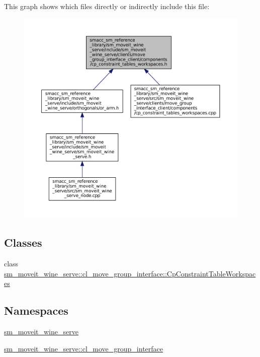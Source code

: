 This graph shows which files directly or indirectly include this file\+:
\nopagebreak
\begin{figure}[H]
\begin{center}
\leavevmode
\includegraphics[width=350pt]{sm__moveit__wine__serve_2include_2sm__moveit__wine__serve_2clients_2move__group__interface__clie8a6212d3ea5fcfefa4f3225b39b4159d}
\end{center}
\end{figure}
\subsection*{Classes}
\begin{DoxyCompactItemize}
\item 
class \hyperlink{classsm__moveit__wine__serve_1_1cl__move__group__interface_1_1CpConstraintTableWorkspaces}{sm\+\_\+moveit\+\_\+wine\+\_\+serve\+::cl\+\_\+move\+\_\+group\+\_\+interface\+::\+Cp\+Constraint\+Table\+Workspaces}
\end{DoxyCompactItemize}
\subsection*{Namespaces}
\begin{DoxyCompactItemize}
\item 
 \hyperlink{namespacesm__moveit__wine__serve}{sm\+\_\+moveit\+\_\+wine\+\_\+serve}
\item 
 \hyperlink{namespacesm__moveit__wine__serve_1_1cl__move__group__interface}{sm\+\_\+moveit\+\_\+wine\+\_\+serve\+::cl\+\_\+move\+\_\+group\+\_\+interface}
\end{DoxyCompactItemize}

